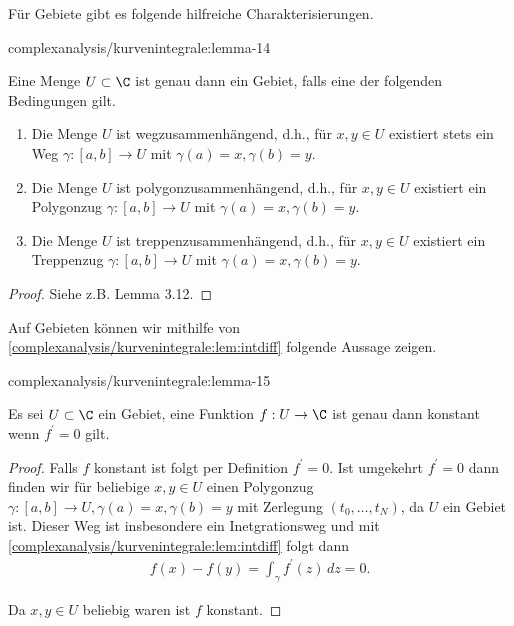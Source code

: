 \documentclass[letterpaper,10pt,german]{jupyterBook}
\begin{document}
\par
Für Gebiete gibt es folgende hilfreiche Charakterisierungen.
\begin{lemma}{}{complexanalysis/kurvenintegrale:lemma-14}



\par
Eine Menge \(U\subset\C\) ist genau dann ein Gebiet, falls eine der folgenden Bedingungen gilt.
\begin{enumerate}

\item {} 
\par
Die Menge \(U\) ist wegzusammenhängend, d.h., für \(x,y\in U\) existiert stets ein Weg \(\gamma:[a,b]\to U\) mit \(\gamma(a)=x,\gamma(b)=y\).

\item {} 
\par
Die Menge \(U\) ist polygonzusammenhängend, d.h., für \(x,y\in U\) existiert ein Polygonzug \(\gamma:[a,b]\to U\) mit \(\gamma(a)=x,\gamma(b)=y\).

\item {} 
\par
Die Menge \(U\) ist treppenzusammenhängend, d.h., für \(x,y\in U\) existiert ein Treppenzug \(\gamma:[a,b]\to U\) mit \(\gamma(a)=x,\gamma(b)=y\).

\end{enumerate}
\end{lemma}

\begin{proof}
 Siehe z.B. \cite{Nee17} Lemma 3.12.
\end{proof}

\par
Auf Gebieten können wir mithilfe von \cref{complexanalysis/kurvenintegrale:lem:intdiff} folgende Aussage zeigen.
\begin{lemma}{}{complexanalysis/kurvenintegrale:lemma-15}



\par
Es sei \(U\subset\C\) ein Gebiet, eine Funktion \(f:U\to\C\) ist genau dann konstant wenn \(f^\prime=0\) gilt.
\end{lemma}

\begin{proof}
 Falls \(f\) konstant ist folgt per Definition \(f^\prime=0\). Ist umgekehrt \(f^\prime=0\) dann finden wir für beliebige \(x,y\in U\) einen Polygonzug \(\gamma:[a,b]\to U, \gamma(a)=x,\gamma(b)=y\) mit Zerlegung \((t_0,\ldots,t_N)\), da \(U\) ein Gebiet ist. Dieser Weg ist insbesondere ein Inetgrationsweg und mit \cref{complexanalysis/kurvenintegrale:lem:intdiff} folgt dann
\begin{align*}
f(x) - f(y) = \int_\gamma f^\prime(z)\, dz = 0.
\end{align*}
\par
Da \(x,y\in U\) beliebig waren ist \(f\) konstant.
\end{proof}
\end{document}
